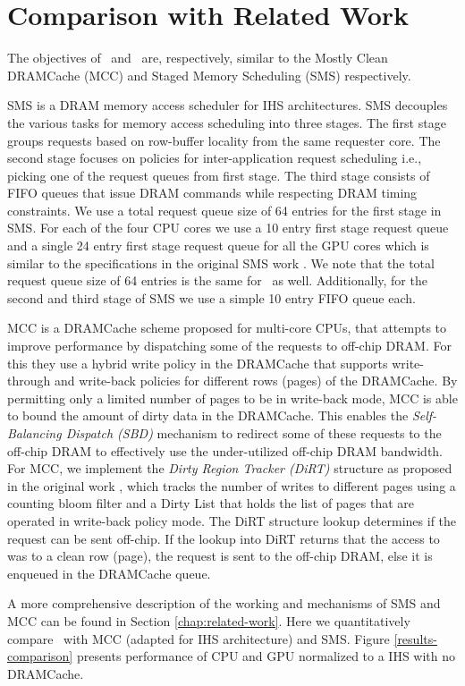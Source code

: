 \section{Comparison with Related Work} \label{comparison}
The objectives of \bypassname\ and \prioname\ are, respectively, similar to the Mostly Clean DRAMCache (MCC) \cite{mostly-clean} and Staged Memory Scheduling (SMS) \cite{sms} respectively. 
\par SMS \cite{sms} is a DRAM memory access scheduler for IHS architectures. SMS decouples the various tasks for memory access scheduling into three stages. The first stage groups requests based on row-buffer locality from the same requester core. The second stage focuses on policies for inter-application request scheduling i.e., picking one of the request queues from first stage. The third stage consists of FIFO queues that issue DRAM commands while respecting DRAM timing constraints. We use a total request queue size of 64 entries for the first stage in SMS. For each of the four CPU cores we use a 10 entry first stage request queue and a single 24 entry first stage request queue for all the GPU cores which is similar to the specifications in the original SMS work \cite{sms}. We note that the total request queue size of 64 entries is the same for \prioname\ as well. Additionally, for the second and third stage of SMS we use a simple 10 entry FIFO queue each.
\par MCC \cite{mostly-clean} is a DRAMCache scheme proposed for multi-core CPUs, that attempts to improve performance by dispatching some of the requests to off-chip DRAM. For this they use a hybrid write policy in the DRAMCache that supports write-through and write-back policies for different rows (pages) of the DRAMCache. By permitting only a limited number of pages to be in write-back mode, MCC is able to bound the amount of dirty data in the DRAMCache. This enables the \textit{Self-Balancing Dispatch (SBD)} mechanism to redirect some of these requests to the off-chip DRAM to effectively use the under-utilized off-chip DRAM bandwidth. For MCC, we implement the \textit{Dirty Region Tracker (DiRT)} structure as proposed in the original work \cite{mostly-clean}, which tracks the number of writes to different pages using a counting bloom filter and a Dirty List that holds the list of pages that are operated in write-back policy mode. The DiRT structure lookup determines if the request can be sent off-chip. If the lookup into DiRT returns that the access to was to a clean row (page), the request is sent to the off-chip DRAM, else it is enqueued in the DRAMCache queue.
\par A more comprehensive description of the working and mechanisms of SMS and MCC can be found in Section \ref{chap:related-work}. Here we quantitatively compare \cachename\ with MCC (adapted for IHS architecture) and SMS. Figure \ref{results-comparison} presents performance of CPU and GPU normalized to a IHS with no DRAMCache.

